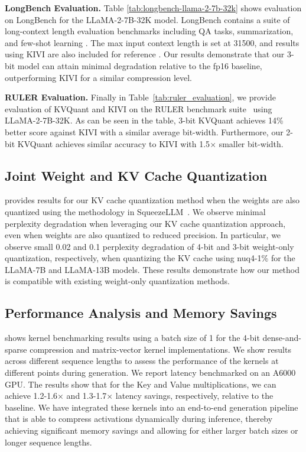 \textbf{LongBench Evaluation.} Table \ref{tab:longbench-llama-2-7b-32k} shows evaluation on LongBench \cite{bai2023longbench} for the LLaMA-2-7B-32K model. LongBench contains a suite of long-context length evaluation benchmarks including QA tasks, summarization, and few-shot learning \cite{bai2023longbench}. The max input context length is set at 31500, and results using KIVI are also included for reference \cite{kivi}. Our results demonstrate that our 3-bit model can attain minimal degradation relative to the fp16 baseline, outperforming KIVI for a similar compression level.

\textbf{RULER Evaluation.} Finally in Table~\ref{tab:ruler_evaluation}, we provide evaluation of {KVQuant} and KIVI on the RULER benchmark suite~\cite{hsieh2024ruler} using LLaMA-2-7B-32K. As can be seen in the table, 3-bit {KVQuant} achieves 14\% better score against KIVI with a similar average bit-width.  Furthermore, our 2-bit {KVQuant} achieves similar accuracy to KIVI with 1.5$\times$ smaller bit-width. 

\subsection{Joint Weight and KV Cache Quantization}

 provides results for our KV cache quantization method when the weights are also quantized using the methodology in SqueezeLLM~\cite{kim2023squeezellm}. We observe minimal perplexity degradation when leveraging our KV cache quantization approach, even when weights are also quantized to reduced precision. In particular, we observe small 0.02 and 0.1 perplexity degradation of 4-bit and 3-bit weight-only quantization, respectively, when quantizing the KV cache using nuq4-1\% for the LLaMA-7B and LLaMA-13B models. These results demonstrate how our method is compatible with existing weight-only quantization methods.

\subsection{Performance Analysis and Memory Savings}
\label{sec:results-kernel-imp}

 shows kernel benchmarking results using a batch size of 1 for the 4-bit dense-and-sparse compression and matrix-vector kernel implementations. We show results across different sequence lengths to assess the performance of the kernels at different points during generation. We report latency benchmarked on an A6000 GPU. The results show that for the Key and Value multiplications, we can achieve 1.2-1.6$\times$ and 1.3-1.7$\times$ latency savings, respectively, relative to the baseline. We have integrated these kernels into an end-to-end generation pipeline that is able to compress activations dynamically during inference, thereby achieving significant memory savings and allowing for either larger batch sizes or longer sequence lengths. 

